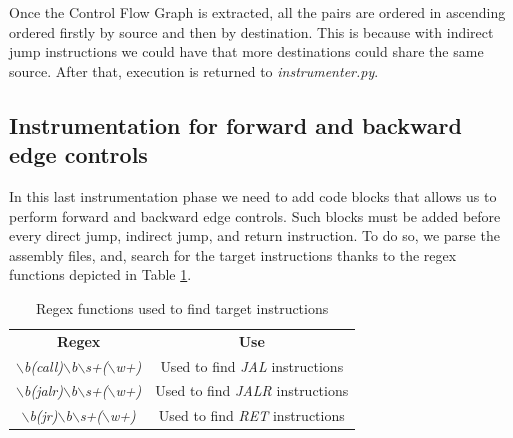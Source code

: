Once the Control Flow Graph is extracted, all the pairs are ordered in ascending
ordered firstly by source and then by destination. This is because with indirect
jump instructions we could have that more destinations could share the same
source. After that, execution is returned to \textit{instrumenter.py}.

\subsection{Instrumentation for forward and backward edge controls}
\label{subsec:project_instrcontrols}

In this last instrumentation phase we need to add code blocks that allows us to
perform forward and backward edge controls. Such blocks must be added before every
direct jump, indirect jump, and return instruction. To do so, we parse the assembly
files, and, search for the target instructions thanks to the regex functions depicted
in Table \ref{tab:regexes}.

\begin{table}
  \centering
  \begin{tabular}{|c|c|}
    \hline
    \textbf{Regex}                                                                      & \textbf{Use}                            \\
    \hhline{==} \textit{$\backslash$b(call)$\backslash$b$\backslash$s+($\backslash$w+)} & Used to find \textit{JAL} instructions  \\
    \hline
    \textit{$\backslash$b(jalr)$\backslash$b$\backslash$s+($\backslash$w+)}             & Used to find \textit{JALR} instructions \\
    \hline
    \textit{$\backslash$b(jr)$\backslash$b$\backslash$s+($\backslash$w+)}               & Used to find \textit{RET} instructions  \\
    \hline
  \end{tabular}
  \caption{Regex functions used to find target instructions}
  \label{tab:regexes}
\end{table}

